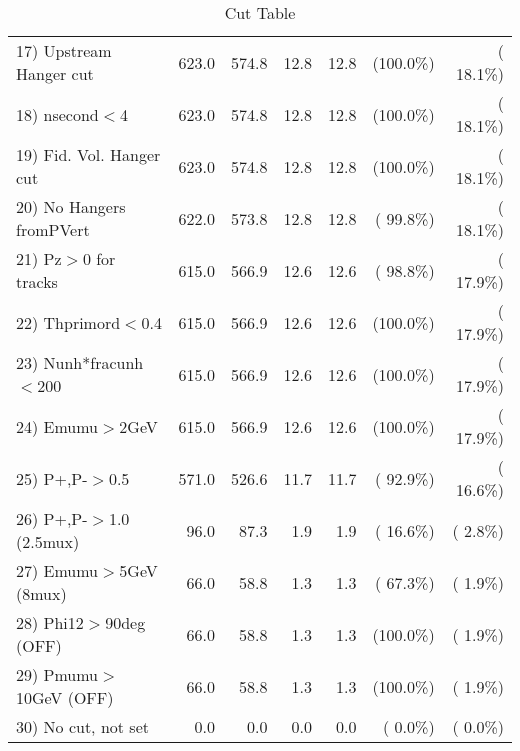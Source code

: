 \begin{table}[h!]
\begin{tabular}{||l||r|r|r|r|r|r||}
 17) Upstream Hanger cut  &        623.0 &        574.8 &         12.8 &         12.8 & (100.0\%) & ( 18.1\%) \\
 18) nsecond$<$4          &        623.0 &        574.8 &         12.8 &         12.8 & (100.0\%) & ( 18.1\%) \\
 19) Fid. Vol. Hanger cut &        623.0 &        574.8 &         12.8 &         12.8 & (100.0\%) & ( 18.1\%) \\
 20) No Hangers fromPVert &        622.0 &        573.8 &         12.8 &         12.8 & ( 99.8\%) & ( 18.1\%) \\
 21) Pz$>$0 for tracks    &        615.0 &        566.9 &         12.6 &         12.6 & ( 98.8\%) & ( 17.9\%) \\
 22) Thprimord$<$0.4      &        615.0 &        566.9 &         12.6 &         12.6 & (100.0\%) & ( 17.9\%) \\
 23) Nunh*fracunh$<$200   &        615.0 &        566.9 &         12.6 &         12.6 & (100.0\%) & ( 17.9\%) \\
 24) Emumu$>$2GeV         &        615.0 &        566.9 &         12.6 &         12.6 & (100.0\%) & ( 17.9\%) \\
 25) P+,P-$>$0.5          &        571.0 &        526.6 &         11.7 &         11.7 & ( 92.9\%) & ( 16.6\%) \\
 26) P+,P-$>$1.0 (2.5mux) &         96.0 &         87.3 &          1.9 &          1.9 & ( 16.6\%) & (  2.8\%) \\
 27) Emumu$>$5GeV  (8mux) &         66.0 &         58.8 &          1.3 &          1.3 & ( 67.3\%) & (  1.9\%) \\
 28) Phi12$>$90deg  (OFF) &         66.0 &         58.8 &          1.3 &          1.3 & (100.0\%) & (  1.9\%) \\
 29) Pmumu$>$10GeV  (OFF) &         66.0 &         58.8 &          1.3 &          1.3 & (100.0\%) & (  1.9\%) \\
 30) No cut, not set      &          0.0 &          0.0 &          0.0 &          0.0 & (  0.0\%) & (  0.0\%) \\
 \hline
 \hline
 \end{tabular}
 \caption{Cut Table           }
 \label{tab-cutheavy_neutrino_4.000}
 \end{table}

